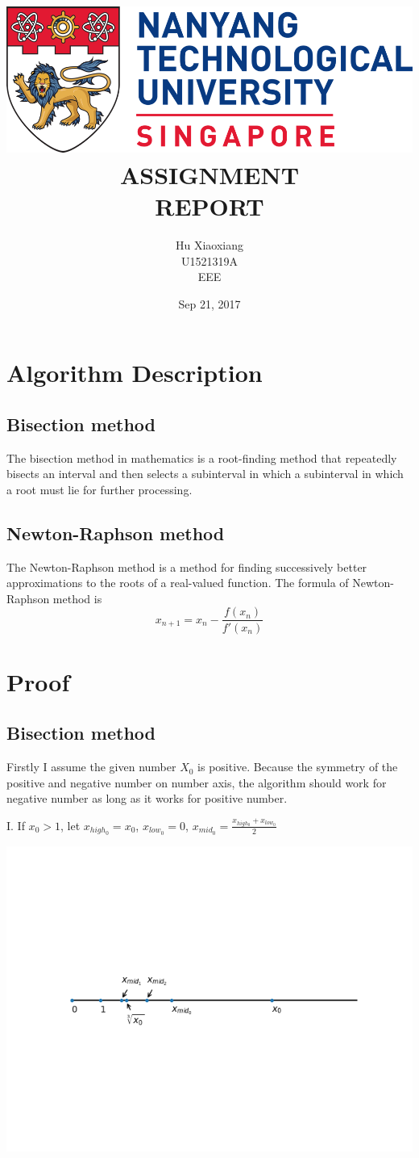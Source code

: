 \documentclass[a4paper]{scrartcl}
\author{Hu Xiaoxiang \\
U1521319A \\
EEE \\
}
\date{Sep 21, 2017 \\
}
\title{\includegraphics[width=\textwidth]{logo_ntu_new.png} \\
[3\baselineskip] ASSIGNMENT \\
REPORT \\
[7\baselineskip]}
\begin{document}
\maketitle
\tableofcontents

\newpage
\section{Algorithm Description}
\label{sec:org9dce6dd}
\subsection{Bisection method}
\label{sec:org39992b2}
The bisection method in mathematics is a root-finding method that repeatedly
bisects an interval and then selects a subinterval in which a subinterval
in which a root must lie for further processing.
\subsection{Newton-Raphson method}
\label{sec:orge994705}
The Newton-Raphson method is a method for finding successively better
approximations to the roots of a real-valued function. The formula of
Newton-Raphson method is $$x_{n+1} = x_n - \frac{f(x_n)}{f'(x_n)}$$

\section{Proof}
\label{sec:org13a16fe}
\subsection{Bisection method}
\label{sec:orgb136c2b}
Firstly I assume the given number \(X_0\) is positive. Because the symmetry of
the positive and negative number on number axis, the algorithm should work
for negative number as long as it works for positive number.

I. If \(x_0 > 1\), let \(x_{high_0} = x_0\), \(x_{low_0} = 0\), \(x_{mid_0} = \frac{x_{high_0} + x_{low_0}}{2}\)
\begin{center}
\includegraphics[width=.9\linewidth]{numberAxis1.png}
\end{center}
\end{document}
